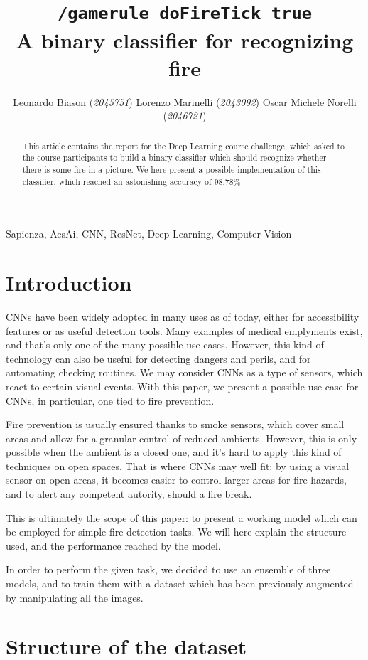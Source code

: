 \documentclass[11pt, journal]{IEEEtran}
\title{\texttt{/gamerule doFireTick true}\\A binary classifier for recognizing fire}
\author{Leonardo Biason (\textit{2045751}) \quad Lorenzo Marinelli (\textit{2043092}) \quad Oscar Michele Norelli (\textit{2046721})}
\newcommand{\nl}{

\medskip

}
\newcommand{\nl}{

\medskip

}
\begin{document}
\maketitle

\begin{abstract}
    This article contains the report for the Deep Learning course challenge, which asked to the course participants to build a binary classifier which should recognize whether there is some fire in a picture. We here present a possible implementation of this classifier, which reached an astonishing accuracy of $\mathbf{98.78\%}$
\end{abstract}

\begin{keywords}
    Sapienza, AcsAi, CNN, ResNet, Deep Learning, Computer Vision 
\end{keywords}

\section{Introduction}

CNNs have been widely adopted in many uses as of today, either for accessibility features or as useful detection tools. Many examples of medical emplyments exist, and that's only one of the many possible use cases. However, this kind of technology can also be useful for detecting dangers and perils, and for automating checking routines. We may consider CNNs as a type of sensors, which react to certain visual events. With this paper, we present a possible use case for CNNs, in particular, one tied to fire prevention.
\nl
\indent Fire prevention is usually ensured thanks to smoke sensors, which cover small areas and allow for a granular control of reduced ambients. However, this is only possible when the ambient is a closed one, and it's hard to apply this kind of techniques on open spaces. That is where CNNs may well fit: by using a visual sensor on open areas, it becomes easier to control larger areas for fire hazards, and to alert any competent autority, should a fire break.
\nl
\indent This is ultimately the scope of this paper: to present a working model which can be employed for simple fire detection tasks. We will here explain the structure used, and the performance reached by the model.
\nl
In order to perform the given task, we decided to use an ensemble of three models, and to train them with a dataset which has been previously augmented by manipulating all the images.

\section{Structure of the dataset}
\end{document}

